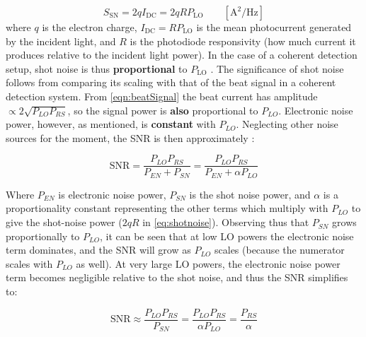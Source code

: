      \begin{equation}
    	S_{\mathrm{SN}} = 2 q I_{\mathrm{DC}} = 2 q R P_{\mathrm{LO}}
    	\qquad [\mathrm{A^2/Hz}]
    	\label{eq:shotnoise}
    \end{equation}
    where $q$ is the electron charge, $I_{\mathrm{DC}} = R P_{\mathrm{LO}}$ is the
    mean photocurrent generated by the incident light, and $R$ is the photodiode responsivity (how much current it produces relative to the incident light power). In the case of a coherent detection setup, shot noise is thus \textbf{proportional} to $P_{\mathrm{LO}}$ \cite{cariou2006laser} \cite{abdelazim_development_2015}. The significance of shot noise follows from comparing its scaling with
    that of the beat signal in a coherent detection system. From \autoref{eqn:beatSignal} the beat current
    has amplitude $\propto 2\sqrt{P_{LO}P_{RS}}$, so the signal
    power is
    \textbf{also} proportional to $P_{LO}$.
    Electronic noise power, however, as mentioned, is \textbf{constant} with $P_{LO}$. Neglecting other noise sources for the moment, the SNR is then approximately
    \cite{cariou2006laser}:
    
    \begin{equation}
        \mathrm{SNR} = \frac{P_{LO} P_{RS}}
                            {P_{EN} + P_{SN}}=\frac{P_{LO} P_{RS}}
                            {P_{EN} + \alpha P_{LO}}
        \label{eqn:lit-SNR}
    \end{equation}

    Where $P_{EN}$ is electronic noise power, $P_{SN}$ is the shot noise power, and $\alpha$ is a proportionality constant representing the other terms which multiply with $P_{LO}$ to give the shot-noise power ($2qR$ in \autoref{eq:shotnoise}). Observing thus that $P_{SN}$ grows proportionally to $P_{LO}$, it can be seen that at low LO powers the electronic noise term dominates, and the SNR will grow as $P_{LO}$ scales (because the numerator scales with $P_{LO}$ as well). At very large LO powers, the electronic noise power term becomes negligible relative to the shot noise, and thus the SNR simplifies to:

    \begin{equation}
    \label{eqn:lit-idealShot}
        \mathrm{SNR} \approx \frac{P_{LO}P_{RS}}{P_{SN}}=\frac{P_{LO}P_{RS}}{\alpha P_{LO}}=\frac{P_{RS}}{\alpha}
    \end{equation}

